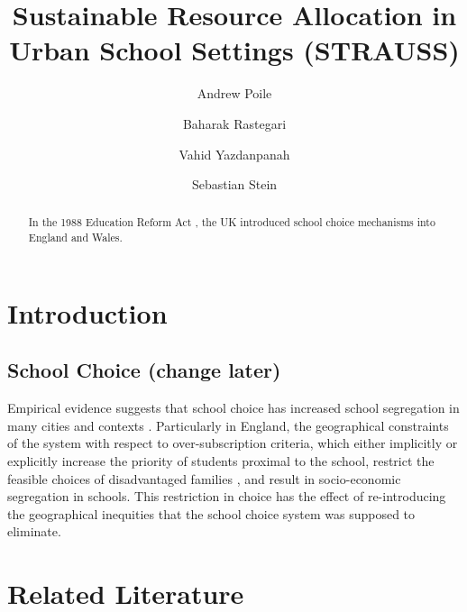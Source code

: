 \documentclass[runningheads]{llncs}
\begin{document}
%
\title{Sustainable Resource Allocation in Urban School Settings
(STRAUSS)}
%
%
\author{Andrew Poile \and
Baharak Rastegari \and
Vahid Yazdanpanah \and
Sebastian Stein}
%
%
%
\maketitle              %
%
\begin{abstract}
In the 1988 Education Reform Act \cite{participationEducationReformAct}, the UK introduced school choice mechanisms into England and Wales. 

\end{abstract}
%
%
%
\section{Introduction}
\subsection{School Choice (change later)}
Empirical evidence suggests that school choice has increased school segregation in many cities and contexts \cite{wilsonSchoolChoiceCity2019}. Particularly in England, the geographical constraints of the system with respect to over-subscription criteria, which either implicitly or explicitly increase the priority of students proximal to the school, restrict the feasible choices of disadvantaged families \cite{burgessParentalChoicePrimary2011a,burgessSchoolChoiceEngland2019}, and result in socio-economic segregation in schools. This restriction in choice has the effect of re-introducing the geographical inequities that the school choice system was supposed to eliminate.

\section{Related Literature}
\end{document}
